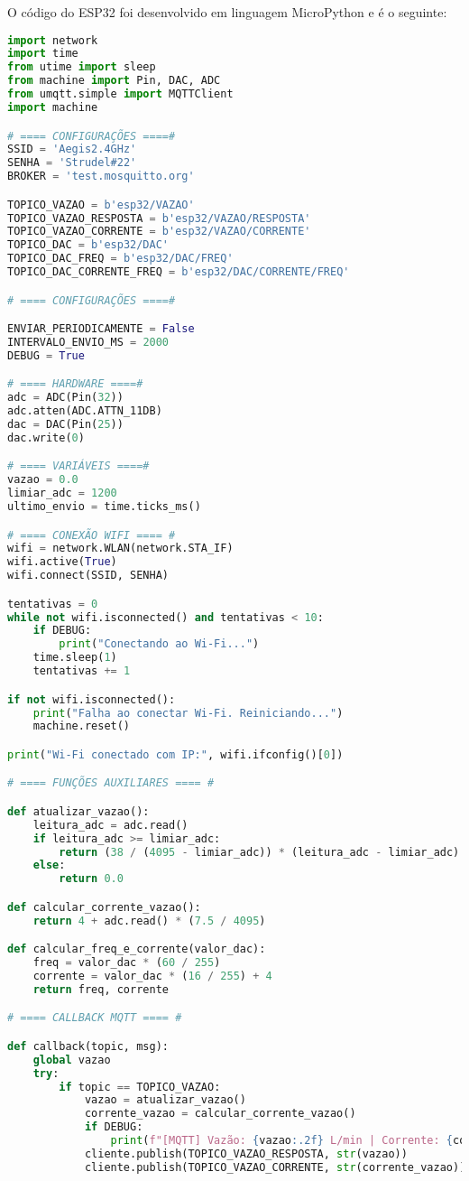 \documentclass[a4paper,12pt]{article}
\begin{document}
O código do ESP32 foi desenvolvido em linguagem MicroPython e é o seguinte:
\begin{lstlisting}[language=Python, caption={Código Principal do ESP32}, label={lst:codigoESP32}]
import network
import time
from utime import sleep
from machine import Pin, DAC, ADC
from umqtt.simple import MQTTClient
import machine

# ==== CONFIGURAÇÕES ====#
SSID = 'Aegis2.4GHz'
SENHA = 'Strudel#22'
BROKER = 'test.mosquitto.org'

TOPICO_VAZAO = b'esp32/VAZAO'
TOPICO_VAZAO_RESPOSTA = b'esp32/VAZAO/RESPOSTA'
TOPICO_VAZAO_CORRENTE = b'esp32/VAZAO/CORRENTE'
TOPICO_DAC = b'esp32/DAC'
TOPICO_DAC_FREQ = b'esp32/DAC/FREQ'
TOPICO_DAC_CORRENTE_FREQ = b'esp32/DAC/CORRENTE/FREQ'

# ==== CONFIGURAÇÕES ====#

ENVIAR_PERIODICAMENTE = False
INTERVALO_ENVIO_MS = 2000
DEBUG = True

# ==== HARDWARE ====#
adc = ADC(Pin(32))
adc.atten(ADC.ATTN_11DB)
dac = DAC(Pin(25))
dac.write(0)

# ==== VARIÁVEIS ====#
vazao = 0.0
limiar_adc = 1200
ultimo_envio = time.ticks_ms()

# ==== CONEXÃO WIFI ==== #
wifi = network.WLAN(network.STA_IF)
wifi.active(True)
wifi.connect(SSID, SENHA)

tentativas = 0
while not wifi.isconnected() and tentativas < 10:
    if DEBUG:
        print("Conectando ao Wi-Fi...")
    time.sleep(1)
    tentativas += 1

if not wifi.isconnected():
    print("Falha ao conectar Wi-Fi. Reiniciando...")
    machine.reset()

print("Wi-Fi conectado com IP:", wifi.ifconfig()[0])

# ==== FUNÇÕES AUXILIARES ==== #

def atualizar_vazao():
    leitura_adc = adc.read()
    if leitura_adc >= limiar_adc:
        return (38 / (4095 - limiar_adc)) * (leitura_adc - limiar_adc)
    else:
        return 0.0

def calcular_corrente_vazao():
    return 4 + adc.read() * (7.5 / 4095)

def calcular_freq_e_corrente(valor_dac):
    freq = valor_dac * (60 / 255)
    corrente = valor_dac * (16 / 255) + 4
    return freq, corrente

# ==== CALLBACK MQTT ==== #

def callback(topic, msg):
    global vazao
    try:
        if topic == TOPICO_VAZAO:
            vazao = atualizar_vazao()
            corrente_vazao = calcular_corrente_vazao()
            if DEBUG:
                print(f"[MQTT] Vazão: {vazao:.2f} L/min | Corrente: {corrente_vazao:.2f} mA")
            cliente.publish(TOPICO_VAZAO_RESPOSTA, str(vazao))
            cliente.publish(TOPICO_VAZAO_CORRENTE, str(corrente_vazao))


\end{lstlisting}
\end{document}
